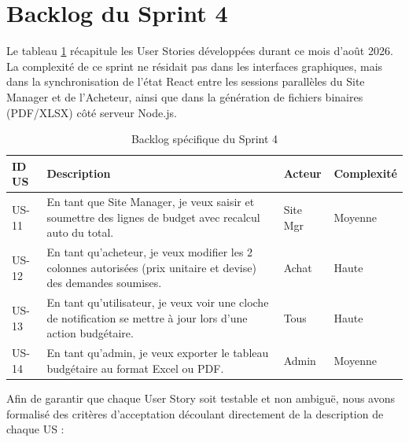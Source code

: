 \section{Backlog du Sprint 4}
Le tableau \ref{tab:backlog_sprint4} récapitule les User Stories développées durant ce mois d'août 2026. La complexité de ce sprint ne résidait pas dans les interfaces graphiques, mais dans la synchronisation de l'état React entre les sessions parallèles du Site Manager et de l'Acheteur, ainsi que dans la génération de fichiers binaires (PDF/XLSX) côté serveur Node.js.

\begin{table}[h]
\centering
\begin{tabular}{|p{2cm}|p{8cm}|p{2cm}|p{2cm}|}
\hline
\textbf{ID US} & \textbf{Description} & \textbf{Acteur} & \textbf{Complexité} \\ \hline
US-11 & En tant que Site Manager, je veux saisir et soumettre des lignes de budget avec recalcul auto du total. & Site Mgr & Moyenne \\ \hline
US-12 & En tant qu'acheteur, je veux modifier les 2 colonnes autorisées (prix unitaire et devise) des demandes soumises. & Achat & Haute \\ \hline
US-13 & En tant qu'utilisateur, je veux voir une cloche de notification se mettre à jour lors d'une action budgétaire. & Tous & Haute \\ \hline
US-14 & En tant qu'admin, je veux exporter le tableau budgétaire au format Excel ou PDF. & Admin & Moyenne \\ \hline
\end{tabular}
\caption{Backlog spécifique du Sprint 4}
\label{tab:backlog_sprint4}
\end{table}

Afin de garantir que chaque User Story soit testable et non ambiguë, nous avons formalisé des critères d'acceptation découlant directement de la description de chaque US :

